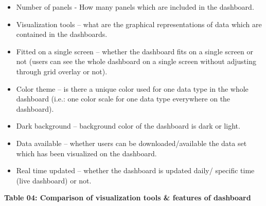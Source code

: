 \documentclass[
]{article}
\providecommand{\tightlist}{%
  \setlength{\itemsep}{0pt}\setlength{\parskip}{0pt}}
\begin{document}
\begin{itemize}
\tightlist
\item
  Number of panels - How many panels which are included in the
  dashboard.
\item
  Visualization tools -- what are the graphical representations of data
  which are contained in the dashboards.
\item
  Fitted on a single screen -- whether the dashboard fits on a single
  screen or not (users can see the whole dashboard on a single screen
  without adjusting through grid overlay or not).
\item
  Color theme -- is there a unique color used for one data type in the
  whole dashboard (i.e.: one color scale for one data type everywhere on
  the dashboard).
\item
  Dark background -- background color of the dashboard is dark or light.
\item
  Data available -- whether users can be downloaded/available the data
  set which has been visualized on the dashboard.
\item
  Real time updated -- whether the dashboard is updated daily/ specific
  time (live dashboard) or not.
\end{itemize}

\textbf{Table 04: Comparison of visualization tools \& features of
dashboard}
\end{document}
